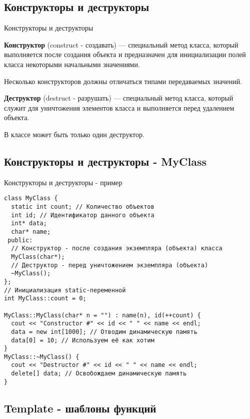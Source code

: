  
\subsection{Конструкторы и деструкторы}

\begin{frame}[t,fragile]{Конструкторы и деструкторы}

\textbf{Конструктор} (construct - создавать) --- 
специальный метод класса, который выполняется после создания объекта и предназначен для инициализации 
полей класса некоторыми начальными значениями.

Несколько конструкторов должны отличаться типами передаваемых значений.

\textbf{Деструктор} (destruct - разрушать) --- 
специальный метод класса, который служит для уничтожения 
элементов класса и выполняется перед удалением объекта. 

В классе может быть только один деструктор.

\end{frame}

\subsection{Конструкторы и деструкторы - MyClass}

\begin{frame}[t,fragile]{Конструкторы и деструкторы - пример}
\begin{lstlisting}
class MyClass {
  static int count; // Количество объектов
  int id; // Идентификатор данного объекта
  int* data;
  char* name;
 public:
  // Конструктор - после создания экземпляра (объекта) класса
  MyClass(char*);
  // Деструктор - перед уничтожением экземпляра (объекта)
  ~MyClass();
};
// Инициализация static-переменной
int MyClass::count = 0;

MyClass::MyClass(char* n = "") : name(n), id(++count) {
  cout << "Constructor #" << id << " " << name << endl;
  data = new int[1000]; // Отводим динамическую память
  data[0] = 10; // Используем её как хотим
}
MyClass::~MyClass() {
  cout << "Destructor #" << id << " " << name << endl;
  delete[] data; // Освобождаем динамическую память
}
\end{lstlisting}
\end{frame}

\subsection{Template - шаблоны функций}

